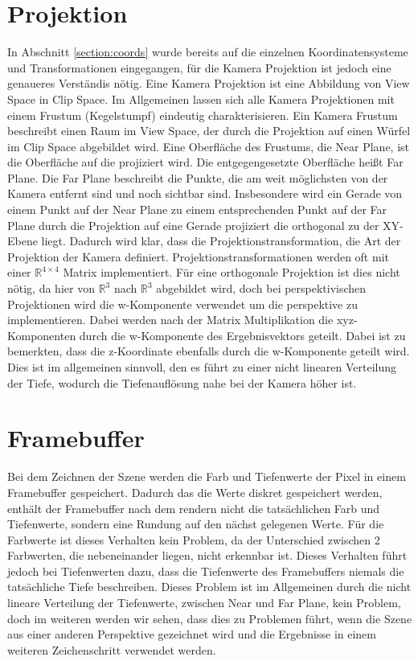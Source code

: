 \section{Projektion}
In Abschnitt \ref{section:coords} wurde bereits auf die einzelnen Koordinatensysteme und Transformationen eingegangen,
für die Kamera Projektion ist jedoch eine genaueres Verständis nötig.
Eine Kamera Projektion ist eine Abbildung von View Space in Clip Space.
Im Allgemeinen lassen sich alle Kamera Projektionen mit einem Frustum (Kegelstumpf) eindeutig charakterisieren.
Ein Kamera Frustum beschreibt einen Raum im View Space, 
der durch die Projektion auf einen Würfel im Clip Space abgebildet wird.
Eine Oberfläche des Frustums, die Near Plane, ist die Oberfläche auf die projiziert wird.
Die entgegengesetzte Oberfläche heißt Far Plane. 
Die Far Plane beschreibt die Punkte, die am weit möglichsten von der Kamera entfernt sind und noch sichtbar sind.
Insbesondere wird ein Gerade von einem Punkt auf der Near Plane zu einem entsprechenden Punkt auf der Far Plane
durch die Projektion auf eine Gerade projiziert die orthogonal zu der XY-Ebene liegt.
Dadurch wird klar, dass die Projektionstransformation, die Art der Projektion der Kamera definiert.
\newline
\newline
Projektionstransformationen werden oft mit einer $\mathbb{R}^{4\times{}4}$ Matrix implementiert.
Für eine orthogonale Projektion ist dies nicht nötig, da hier von $\mathbb{R}^3$ nach $\mathbb{R}^3$ abgebildet wird,
doch bei perspektivischen Projektionen wird die w-Komponente verwendet um die perspektive zu implementieren.
Dabei werden nach der Matrix Multiplikation die xyz-Komponenten durch die w-Komponente des Ergebnisvektors geteilt.
Dabei ist zu bemerkten, dass die z-Koordinate ebenfalls durch die w-Komponente geteilt wird. 
Dies ist im allgemeinen sinnvoll, den es führt zu einer nicht linearen Verteilung der Tiefe, wodurch die Tiefenauflösung
nahe bei der Kamera höher ist.

\section{Framebuffer}
Bei dem Zeichnen der Szene werden die Farb und Tiefenwerte der Pixel in einem Framebuffer gespeichert.
Dadurch das die Werte diskret gespeichert werden, enthält der Framebuffer nach dem rendern nicht die tatsächlichen Farb und 
Tiefenwerte, sondern eine Rundung auf den nächst gelegenen Werte.
Für die Farbwerte ist dieses Verhalten kein Problem, da der Unterschied zwischen 2 Farbwerten, die nebeneinander liegen, nicht erkennbar ist.
Dieses Verhalten führt jedoch bei Tiefenwerten dazu, dass die Tiefenwerte des Framebuffers niemals die tatsächliche Tiefe beschreiben.
Dieses Problem ist im Allgemeinen durch die nicht lineare Verteilung der Tiefenwerte, zwischen Near und Far Plane, kein Problem, 
doch im weiteren werden wir sehen, dass dies zu Problemen führt, wenn die Szene aus einer anderen Perspektive gezeichnet wird 
und die Ergebnisse in einem weiteren Zeichenschritt verwendet werden.

